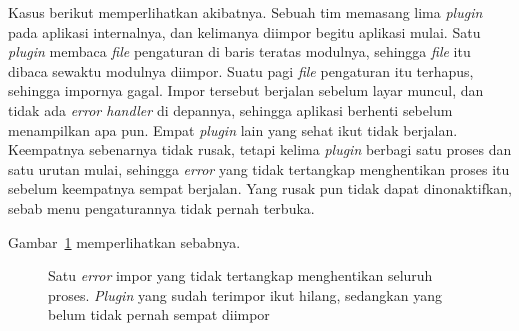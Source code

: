 Kasus berikut memperlihatkan akibatnya. Sebuah tim memasang lima
\textit{plugin} pada aplikasi internalnya, dan kelimanya diimpor begitu aplikasi
mulai. Satu \textit{plugin} membaca \textit{file} pengaturan di baris teratas
modulnya, sehingga \textit{file} itu dibaca sewaktu modulnya diimpor. Suatu pagi
\textit{file} pengaturan itu terhapus, sehingga impornya gagal. Impor tersebut
berjalan sebelum layar muncul, dan tidak ada \textit{error handler} di depannya,
sehingga aplikasi berhenti sebelum menampilkan apa pun. Empat \textit{plugin}
lain yang sehat ikut tidak berjalan. Keempatnya sebenarnya tidak rusak, tetapi
kelima \textit{plugin} berbagi satu proses dan satu urutan mulai, sehingga
\textit{error} yang tidak tertangkap menghentikan proses itu sebelum keempatnya
sempat berjalan. Yang rusak pun tidak dapat dinonaktifkan, sebab menu
pengaturannya tidak pernah terbuka.

Gambar~\ref{fig:proses-berhenti} memperlihatkan sebabnya.

\begin{figure}[htbp]
  \centering
  \caption{Satu \textit{error} impor yang tidak tertangkap menghentikan seluruh proses. \textit{Plugin} yang sudah terimpor ikut hilang, sedangkan yang belum tidak pernah sempat diimpor}
  \label{fig:proses-berhenti}
\end{figure}

